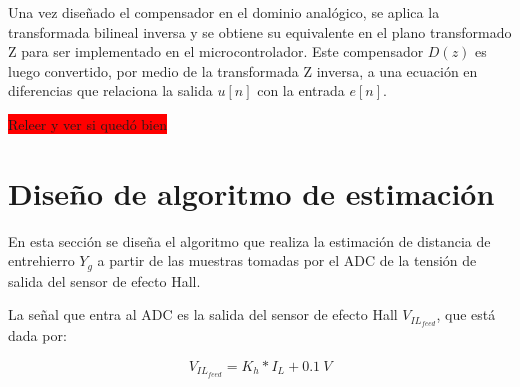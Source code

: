 Una vez diseñado el compensador en el dominio analógico, se aplica la transformada bilineal inversa y se obtiene su equivalente en el plano transformado Z para ser implementado en el microcontrolador. Este compensador $D(z)$ es luego convertido, por medio de la transformada Z inversa, a una ecuación en diferencias que relaciona la salida $u[n]$ con la entrada $e[n]$. 


\colorbox{red}{Releer y ver si quedó bien}

%
%
%
%
%



\section{Diseño de algoritmo de estimación}

En esta sección se diseña el algoritmo que realiza la estimación de distancia de entrehierro $Y_g$ a partir de las muestras tomadas por el ADC de la tensión de salida del sensor de efecto Hall.

La señal que entra al ADC es la salida del sensor de efecto Hall $V_{IL_{feed}}$, que está dada por:

\begin{equation*}
	V_{IL_{feed}}=K_h*I_L+0.1\:V
\end{equation*}

